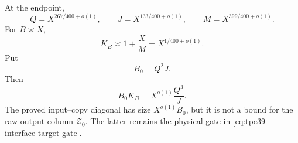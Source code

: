 At the endpoint,
\begin{equation}
 Q=X^{267/400+o(1)},
 \qquad
 J=X^{133/400+o(1)},
 \qquad
 M=X^{399/400+o(1)}.
 \label{eq:tpc39-interface-endpoint}
\end{equation}
For \(B\asymp X\),
\begin{equation}
 K_B\asymp 1+\frac XM
 =X^{1/400+o(1)}.
 \label{eq:tpc39-interface-K}
\end{equation}
Put
\begin{equation}
 B_0=Q^2J.
 \label{eq:tpc39-interface-B0}
\end{equation}
Then
\begin{equation}
 \boxed{
 B_0K_B
 =X^{o(1)}\frac{Q^3}{J}.}
 \label{eq:tpc39-interface-key-ledger}
\end{equation}
The proved input--copy diagonal has size \(X^{o(1)}B_0\), but it is not a
bound for the raw output column \(\mathscr Z_0\).  The latter remains the
physical gate in \eqref{eq:tpc39-interface-target-gate}.
